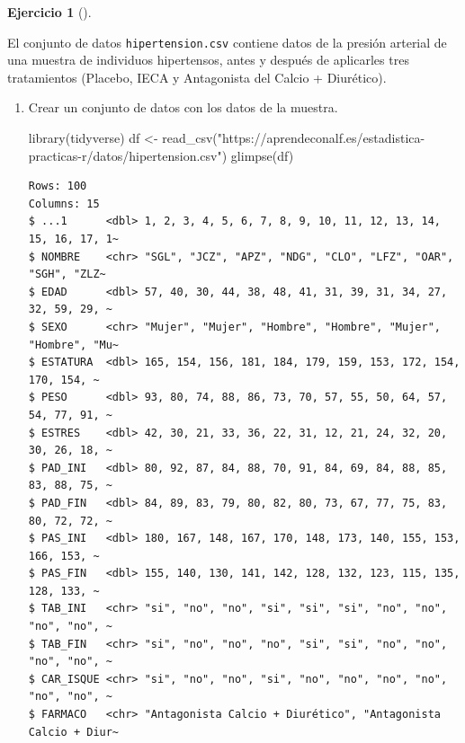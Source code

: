 \documentclass[
  a4paper,
]{scrreport}
\newenvironment{Shaded}{\begin{snugshade}}{\end{snugshade}}
\newcommand{\FunctionTok}[1]{\textcolor[rgb]{0.28,0.35,0.67}{#1}}
\newcommand{\NormalTok}[1]{\textcolor[rgb]{0.00,0.23,0.31}{#1}}
\newcommand{\OtherTok}[1]{\textcolor[rgb]{0.00,0.23,0.31}{#1}}
\newcommand{\StringTok}[1]{\textcolor[rgb]{0.13,0.47,0.30}{#1}}
\theoremstyle{definition}
\newtheorem{exercise}{Ejercicio}[chapter]
\theoremstyle{remark}
\begin{document}
\begin{exercise}[]\protect\hypertarget{exr-contraste-hipotesis-media-hipertension}{}\label{exr-contraste-hipotesis-media-hipertension}

El conjunto de datos \texttt{hipertension.csv} contiene datos de la
presión arterial de una muestra de individuos hipertensos, antes y
después de aplicarles tres tratamientos (Placebo, IECA y Antagonista del
Calcio + Diurético).

\begin{enumerate}
\def\labelenumi{\alph{enumi}.}
\item
  Crear un conjunto de datos con los datos de la muestra.

  \begin{tcolorbox}[enhanced jigsaw, coltitle=black, left=2mm, colback=white, leftrule=.75mm, toptitle=1mm, breakable, bottomrule=.15mm, titlerule=0mm, bottomtitle=1mm, title=\textcolor{quarto-callout-tip-color}{\faLightbulb}\hspace{0.5em}{Solución}, arc=.35mm, toprule=.15mm, rightrule=.15mm, colframe=quarto-callout-tip-color-frame, opacityback=0, colbacktitle=quarto-callout-tip-color!10!white, opacitybacktitle=0.6]

\begin{Shaded}
\begin{Highlighting}[]
\FunctionTok{library}\NormalTok{(tidyverse)}
\NormalTok{df }\OtherTok{\textless{}{-}} \FunctionTok{read\_csv}\NormalTok{(}\StringTok{"https://aprendeconalf.es/estadistica{-}practicas{-}r/datos/hipertension.csv"}\NormalTok{)}
\FunctionTok{glimpse}\NormalTok{(df)}
\end{Highlighting}
\end{Shaded}

\begin{verbatim}
Rows: 100
Columns: 15
$ ...1      <dbl> 1, 2, 3, 4, 5, 6, 7, 8, 9, 10, 11, 12, 13, 14, 15, 16, 17, 1~
$ NOMBRE    <chr> "SGL", "JCZ", "APZ", "NDG", "CLO", "LFZ", "OAR", "SGH", "ZLZ~
$ EDAD      <dbl> 57, 40, 30, 44, 38, 48, 41, 31, 39, 31, 34, 27, 32, 59, 29, ~
$ SEXO      <chr> "Mujer", "Mujer", "Hombre", "Hombre", "Mujer", "Hombre", "Mu~
$ ESTATURA  <dbl> 165, 154, 156, 181, 184, 179, 159, 153, 172, 154, 170, 154, ~
$ PESO      <dbl> 93, 80, 74, 88, 86, 73, 70, 57, 55, 50, 64, 57, 54, 77, 91, ~
$ ESTRES    <dbl> 42, 30, 21, 33, 36, 22, 31, 12, 21, 24, 32, 20, 30, 26, 18, ~
$ PAD_INI   <dbl> 80, 92, 87, 84, 88, 70, 91, 84, 69, 84, 88, 85, 83, 88, 75, ~
$ PAD_FIN   <dbl> 84, 89, 83, 79, 80, 82, 80, 73, 67, 77, 75, 83, 80, 72, 72, ~
$ PAS_INI   <dbl> 180, 167, 148, 167, 170, 148, 173, 140, 155, 153, 166, 153, ~
$ PAS_FIN   <dbl> 155, 140, 130, 141, 142, 128, 132, 123, 115, 135, 128, 133, ~
$ TAB_INI   <chr> "si", "no", "no", "si", "si", "si", "no", "no", "no", "no", ~
$ TAB_FIN   <chr> "si", "no", "no", "no", "si", "si", "no", "no", "no", "no", ~
$ CAR_ISQUE <chr> "si", "no", "no", "si", "no", "no", "no", "no", "no", "no", ~
$ FARMACO   <chr> "Antagonista Calcio + Diurético", "Antagonista Calcio + Diur~
\end{verbatim}


\end{tcolorbox}
\end{enumerate}
\end{exercise}
\end{document}
